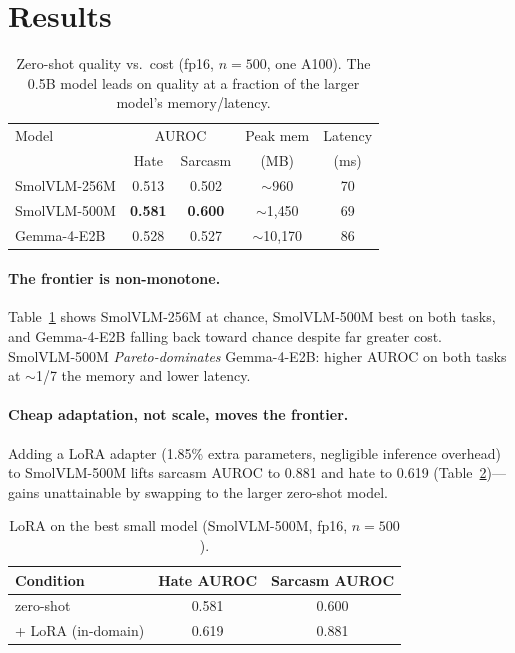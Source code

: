 \documentclass[sigconf,nonacm]{acmart}
\begin{document}
\section{Results}

\begin{table}[t]
\centering
\caption{Zero-shot quality vs.\ cost (fp16, $n{=}500$, one A100). The 0.5B model leads on
quality at a fraction of the larger model's memory/latency.}
\label{tab:pareto}
\begin{tabular}{lcccc}
\toprule
Model & \multicolumn{2}{c}{AUROC} & Peak mem & Latency \\
      & Hate & Sarcasm & (MB) & (ms) \\
\midrule
SmolVLM-256M & 0.513 & 0.502 & \(\sim\)960  & 70 \\
SmolVLM-500M & \textbf{0.581} & \textbf{0.600} & \(\sim\)1{,}450 & 69 \\
Gemma-4-E2B  & 0.528 & 0.527 & \(\sim\)10{,}170 & 86 \\
\bottomrule
\end{tabular}
\end{table}

\paragraph{The frontier is non-monotone.} Table~\ref{tab:pareto} shows SmolVLM-256M at
chance, SmolVLM-500M best on both tasks, and Gemma-4-E2B falling back toward chance
despite far greater cost. SmolVLM-500M \emph{Pareto-dominates} Gemma-4-E2B: higher AUROC
on both tasks at $\sim$1/7 the memory and lower latency.

\paragraph{Cheap adaptation, not scale, moves the frontier.} Adding a LoRA adapter
(1.85\% extra parameters, negligible inference overhead) to SmolVLM-500M lifts sarcasm
AUROC to 0.881 and hate to 0.619 (Table~\ref{tab:lora})---gains unattainable by swapping
to the larger zero-shot model.

\begin{table}[t]
\centering
\caption{LoRA on the best small model (SmolVLM-500M, fp16, $n{=}500$).}
\label{tab:lora}
\begin{tabular}{lcc}
\toprule
Condition & Hate AUROC & Sarcasm AUROC \\
\midrule
zero-shot & 0.581 & 0.600 \\
+ LoRA (in-domain) & 0.619 & 0.881 \\
\bottomrule
\end{tabular}
\end{table}
\end{document}
